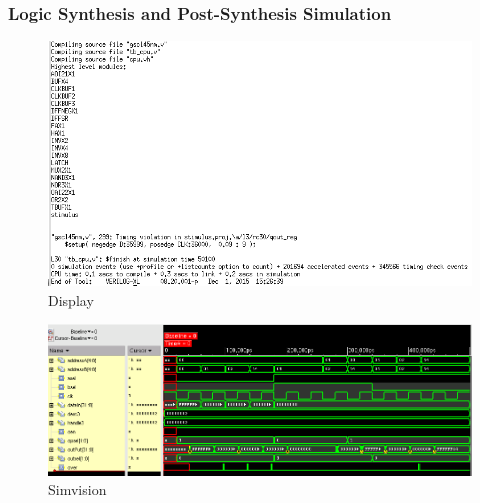 \documentclass[12pt]{article}
\begin{document}
\subsubsection{Logic Synthesis and Post-Synthesis Simulation}
\begin{figure}[H]
\centering
\includegraphics[width=\linewidth]{../CRA/synth-text}
\caption{Display}
\label{fig:synth-text}
\end{figure}
\begin{figure}[H]
\centering
\includegraphics[width=\linewidth]{../CRA/synth-test}
\caption{Simvision}
\label{fig:synth-test}
\end{figure}
\end{document}

